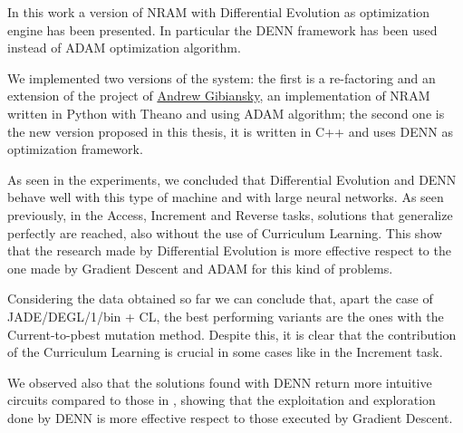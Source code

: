 

In this work a version of NRAM with Differential Evolution as optimization engine has been presented. In particular the DENN framework has been used instead of ADAM optimization algorithm. 

We implemented two versions of the system: the first is a re-factoring and an extension of the project of \hyperref[https://github.com/gibiansky/experiments/tree/master/nram]{Andrew Gibiansky}, an implementation of NRAM written in Python with Theano and using ADAM algorithm; the second one is the new version proposed in this thesis, it is written in C++ and uses DENN as optimization framework. 

As seen in the experiments, we concluded that Differential Evolution and DENN behave well with this type of machine and with large neural networks. As seen previously, in the Access, Increment and Reverse tasks, solutions that generalize perfectly are reached, also without the use of Curriculum Learning. This show that the research made by Differential Evolution is more effective respect to the one made by Gradient Descent and ADAM for this kind of problems. 

Considering the data obtained so far we can conclude that, apart the case of JADE/DEGL/1/bin + CL, the best performing variants are the ones with the Current-to-pbest mutation method. Despite this, it is clear that the contribution of the Curriculum Learning is crucial in some cases like in the Increment task.

We observed also that the solutions found with DENN return more intuitive circuits compared to those in \cite{NRAM:2016}, showing that the exploitation and exploration done by DENN is more effective respect to those executed by Gradient Descent.

